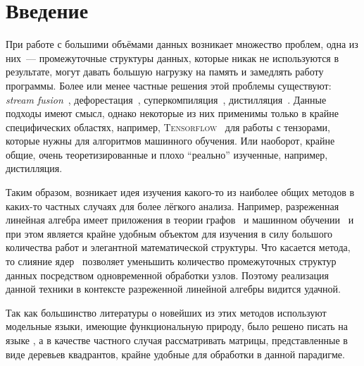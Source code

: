 
\section*{Введение}
При работе с большими объёмами данных возникает множество проблем, одна из них~--- промежуточные структуры данных, которые никак не используются в результате, могут давать большую нагрузку на память и замедлять работу программы.
Более или менее частные решения этой проблемы существуют: \textit{stream fusion}~\cite{stream_fusion}, дефорестация~\cite{deforestation}, суперкомпиляция~\cite{supercompiler}, дистилляция~\cite{distillation}.
Данные подходы имеют смысл, однако некоторые из них применимы только в крайне специфических областях, например, \textsc{Tensorflow}~\cite{tensorflow} для работы с тензорами, которые нужны для алгоритмов машинного обучения.
Или наоборот, крайне общие, очень теоретизированные и плохо \enquote{реально} изученные, например, дистилляция.

Таким образом, возникает идея изучения какого-то из наиболее общих методов в каких-то частных случаях для более лёгкого анализа.
Например, разреженная линейная алгебра имеет приложения  в теории графов~\cite{kepner2011graph} и машинном обучении~\cite{8091098} и при этом является крайне удобным объектом для изучения в силу большого количества работ и элегантной математической структуры.
Что касается метода, то слияние ядер~\cite{5724850} позволяет уменьшить количество промежуточных структур данных посредством одновременной обработки узлов.
Поэтому реализация данной техники в контексте разреженной линейной алгебры видится удачной.

Так как большинство литературы о новейших из этих методов используют модельные языки, имеющие функциональную природу, было решено писать на языке \Haskell{}, а в качестве частного случая рассматривать матрицы, представленные в виде деревьев квадрантов, крайне удобные для обработки в данной парадигме.
